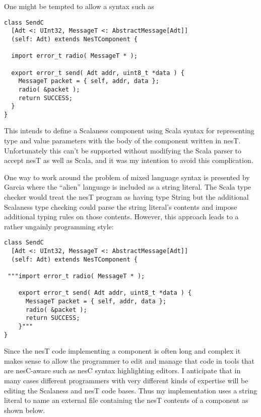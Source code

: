 One might be tempted to allow a syntax such as

\singlespace
\vspace{1.0ex}
\begin{lstlisting}[language=scalaness]
class SendC
  [Adt <: UInt32, MessageT <: AbstractMessage[Adt]]
  (self: Adt) extends NesTComponent {

  import error_t radio( MessageT * );

  export error_t send( Adt addr, uint8_t *data ) {
    MessageT packet = { self, addr, data };
    radio( &packet );
    return SUCCESS;
  }
}
\end{lstlisting}
\vspace{1.0ex}
\primaryspacing

This intends to define a Scalaness component using Scala syntax for representing type and value
parameters with the body of the component written in nesT. Unfortunately this can't be supported
without modifying the Scala parser to accept nesT as well as Scala, and it was my intention to
avoid this complication.

One way to work around the problem of mixed language syntax is presented by Garcia
\cite{Garcia-Scala-Query} where the ``alien'' language is included as a string literal. The
Scala type checker would treat the nesT program as having type String but the additional
Scalaness type checking could parse the string literal's contents and impose additional typing
rules on those contents. However, this approach leads to a rather ungainly programming style:

\singlespace
\vspace{1.0ex}
\begin{lstlisting}[language=scalaness]
class SendC
  [Adt <: UInt32, MessageT <: AbstractMessage[Adt]]
  (self: Adt) extends NesTComponent {

 """import error_t radio( MessageT * );

    export error_t send( Adt addr, uint8_t *data ) {
      MessageT packet = { self, addr, data };
      radio( &packet );
      return SUCCESS;
    }"""
}
\end{lstlisting}
\vspace{1.0ex}
\primaryspacing

Since the nesT code implementing a component is often long and complex it makes sense to allow
the programmer to edit and manage that code in tools that are nesC-aware such as nesC syntax
highlighting editors. I anticipate that in many cases different programmers with very different
kinds of expertise will be editing the Scalaness and nesT code bases. Thus my implementation
uses a string literal to name an external file containing the nesT contents of a component as
shown below.

